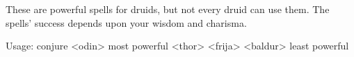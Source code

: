 These are powerful spells for druids,
but not every druid can use them. The
spells' success depends upon your  
wisdom and charisma.

Usage: conjure <odin>    most powerful
               <thor>
               <frija>
               <baldur>  least powerful
